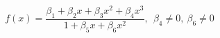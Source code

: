 

\[
f(x) = \frac{\beta_1 + \beta_2x + \beta_3x^2 + \beta_4x^3}{1 + \beta_5x + \beta_6x^2}, \ \ \beta_4 \neq 0, \ \beta_6 \neq 0
\]


